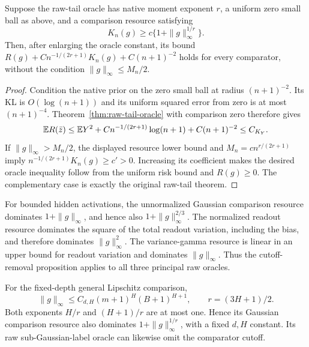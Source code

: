 \begin{proposition}
\label{prop:raw-cutoff-removal}
Suppose the raw-tail oracle has native moment exponent $r$, a uniform
zero small ball as above, and a comparison resource satisfying
\[
 K_n(g)\ge c\{1+\|g\|_\infty^{1/r}\}.
\]
Then, after enlarging the oracle constant, its bound
$R(g)+C n^{-1/(2r+1)}K_n(g)+C(n+1)^{-2}$ holds for every comparator,
without the condition $\|g\|_\infty\le M_n/2$.
\end{proposition}
\begin{proof}
Condition the native prior on the zero small ball at radius
$(n+1)^{-2}$. Its KL is $O(\log(n+1))$ and its uniform squared error
from zero is at most $(n+1)^{-4}$. Theorem~\ref{thm:raw-tail-oracle} with
comparison zero therefore gives
\[
 \mathbb E R(\bar z)\le\mathbb E Y^2+C n^{-1/(2r+1)}\log(n+1)+C(n+1)^{-2}
                  \le C_{K_Y}.
\]
If $\|g\|_\infty>M_n/2$, the displayed resource lower bound and
$M_n=c n^{r/(2r+1)}$ imply
$n^{-1/(2r+1)}K_n(g)\ge c'>0$.
Increasing its coefficient makes the desired oracle inequality follow
from the uniform risk bound and $R(g)\ge0$. The complementary case
is exactly the original raw-tail theorem.
\end{proof}

For bounded hidden activations, the unnormalized Gaussian comparison
resource dominates $1+\|g\|_\infty$, and hence also
$1+\|g\|_\infty^{2/3}$. The normalized readout resource dominates
the square of the total readout variation, including the bias, and
therefore dominates $\|g\|_\infty^2$. The variance-gamma resource is
linear in an upper bound for readout variation and dominates
$\|g\|_\infty$. Thus the cutoff-removal proposition applies to all
three principal raw oracles.

For the fixed-depth general Lipschitz comparison,
\[
 \|g\|_\infty\le C_{d,H}(m+1)^H(B+1)^{H+1},
 \qquad r=(3H+1)/2.
\]
Both exponents $H/r$ and $(H+1)/r$ are at most one. Hence its
Gaussian comparison resource also dominates
$1+\|g\|_\infty^{1/r}$, with a fixed $d,H$ constant. Its raw
sub-Gaussian-label oracle can likewise omit the comparator cutoff.
